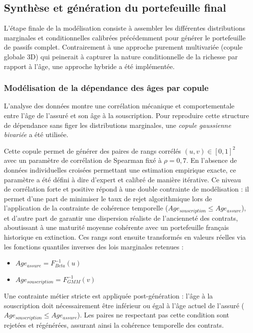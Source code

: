 \subsection{Synthèse et génération du portefeuille final}

L'étape finale de la modélisation consiste à assembler les différentes distributions marginales et conditionnelles calibrées précédemment pour générer le portefeuille de passifs complet. Contrairement à une approche purement multivariée (copule globale 3D) qui peinerait à capturer la nature conditionnelle de la richesse par rapport à l'âge, une approche hybride a été implémentée.

\subsubsection{Modélisation de la dépendance des âges par copule}

L'analyse des données montre une corrélation mécanique et comportementale entre l'âge de l'assuré et son âge à la souscription. Pour reproduire cette structure de dépendance sans figer les distributions marginales, une \textit{copule gaussienne bivariée} a été utilisée.

Cette copule permet de générer des paires de rangs corrélés $(u, v) \in [0, 1]^2$ avec un paramètre de corrélation de Spearman fixé à $\rho = 0{,}7$. 
En l'absence de données individuelles croisées permettant une estimation empirique exacte, ce paramètre a été défini à dire d'expert et calibré de manière itérative. Ce niveau de corrélation forte et positive répond à une double contrainte de modélisation : il permet d'une part de minimiser le taux de rejet algorithmique lors de l'application de la contrainte de cohérence temporelle ($Age_{souscription} \leq Age_{assure}$), et d'autre part de garantir une dispersion réaliste de l'ancienneté des contrats, aboutissant à une maturité moyenne cohérente avec un portefeuille français historique en extinction.
Ces rangs sont ensuite transformés en valeurs réelles via les fonctions quantiles inverses des lois marginales retenues :

\begin{itemize}
    \item $Age_{assure} = F^{-1}_{Beta}(u)$
    \item $Age_{souscription} = F^{-1}_{GMM}(v)$
\end{itemize}

Une contrainte métier stricte est appliquée post-génération : l'âge à la souscription doit nécessairement être inférieur ou égal à l'âge actuel de l'assuré ($Age_{souscription} \leq Age_{assure}$). Les paires ne respectant pas cette condition sont rejetées et régénérées, assurant ainsi la cohérence temporelle des contrats.

